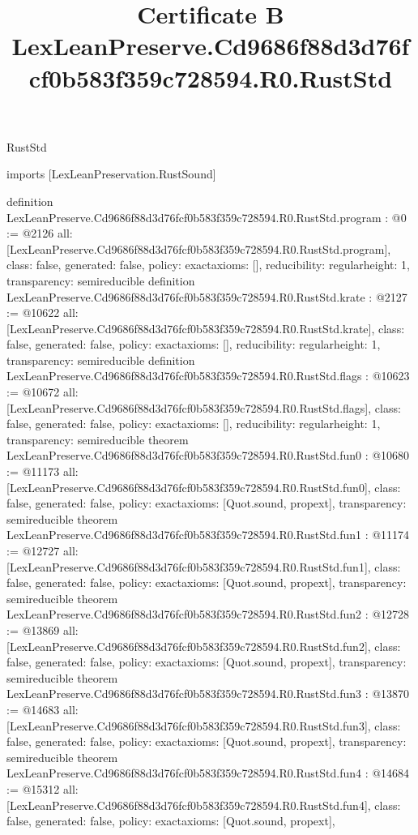 \begin{lexlean}{RustStd}
\title{Certificate B LexLeanPreserve.Cd9686f88d3d76fcf0b583f359c728594.R0.RustStd}
\begin{coremodule}
imports [LexLeanPreservation.RustSound]

definition LexLeanPreserve.Cd9686f88d3d76fcf0b583f359c728594.R0.RustStd.program : @0 := @2126 {
  all: [LexLeanPreserve.Cd9686f88d3d76fcf0b583f359c728594.R0.RustStd.program],
  class: false,
  generated: false,
  policy: exact{axioms: []},
  reducibility: regular{height: 1},
  transparency: semireducible
}
definition LexLeanPreserve.Cd9686f88d3d76fcf0b583f359c728594.R0.RustStd.krate : @2127 := @10622 {
  all: [LexLeanPreserve.Cd9686f88d3d76fcf0b583f359c728594.R0.RustStd.krate],
  class: false,
  generated: false,
  policy: exact{axioms: []},
  reducibility: regular{height: 1},
  transparency: semireducible
}
definition LexLeanPreserve.Cd9686f88d3d76fcf0b583f359c728594.R0.RustStd.flags : @10623 := @10672 {
  all: [LexLeanPreserve.Cd9686f88d3d76fcf0b583f359c728594.R0.RustStd.flags],
  class: false,
  generated: false,
  policy: exact{axioms: []},
  reducibility: regular{height: 1},
  transparency: semireducible
}
theorem LexLeanPreserve.Cd9686f88d3d76fcf0b583f359c728594.R0.RustStd.fun0 : @10680 := @11173 {
  all: [LexLeanPreserve.Cd9686f88d3d76fcf0b583f359c728594.R0.RustStd.fun0],
  class: false,
  generated: false,
  policy: exact{axioms: [Quot.sound, propext]},
  transparency: semireducible
}
theorem LexLeanPreserve.Cd9686f88d3d76fcf0b583f359c728594.R0.RustStd.fun1 : @11174 := @12727 {
  all: [LexLeanPreserve.Cd9686f88d3d76fcf0b583f359c728594.R0.RustStd.fun1],
  class: false,
  generated: false,
  policy: exact{axioms: [Quot.sound, propext]},
  transparency: semireducible
}
theorem LexLeanPreserve.Cd9686f88d3d76fcf0b583f359c728594.R0.RustStd.fun2 : @12728 := @13869 {
  all: [LexLeanPreserve.Cd9686f88d3d76fcf0b583f359c728594.R0.RustStd.fun2],
  class: false,
  generated: false,
  policy: exact{axioms: [Quot.sound, propext]},
  transparency: semireducible
}
theorem LexLeanPreserve.Cd9686f88d3d76fcf0b583f359c728594.R0.RustStd.fun3 : @13870 := @14683 {
  all: [LexLeanPreserve.Cd9686f88d3d76fcf0b583f359c728594.R0.RustStd.fun3],
  class: false,
  generated: false,
  policy: exact{axioms: [Quot.sound, propext]},
  transparency: semireducible
}
theorem LexLeanPreserve.Cd9686f88d3d76fcf0b583f359c728594.R0.RustStd.fun4 : @14684 := @15312 {
  all: [LexLeanPreserve.Cd9686f88d3d76fcf0b583f359c728594.R0.RustStd.fun4],
  class: false,
  generated: false,
  policy: exact{axioms: [Quot.sound, propext]},
}
\end{coremodule}
\end{lexlean}
